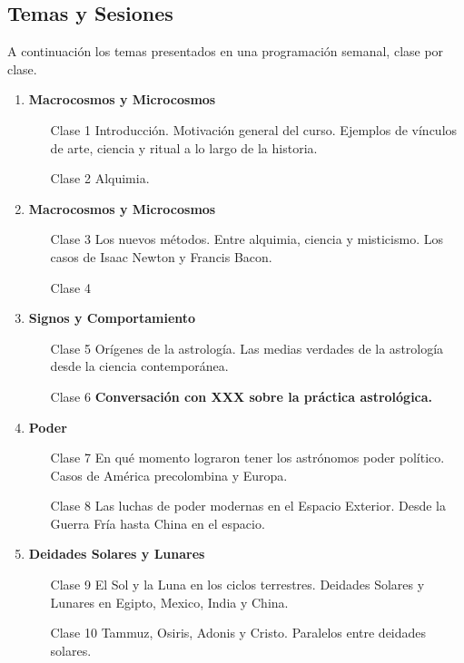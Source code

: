 \documentclass{report}
\begin{document}
\subsection*{Temas y Sesiones}

A continuaci\'on los temas presentados en una programaci\'on semanal,
clase por clase.

\begin{enumerate}
\item {\bf Macrocosmos y Microcosmos}
\begin{itemize}
\item[Clase 1] Introducci\'on. Motivaci\'on general del
  curso. Ejemplos de v\'inculos de arte, ciencia y ritual a lo
  largo de la historia.
\item[Clase 2] Alquimia.
\end{itemize}

\item {\bf Macrocosmos y Microcosmos}
\begin{itemize}
\item[Clase 3]  Los nuevos   m\'etodos. Entre alquimia, ciencia y
  misticismo.  Los casos de Isaac Newton y Francis Bacon. 
\item[Clase 4]
\end{itemize}

\item {\bf Signos y Comportamiento}
\begin{itemize}
\item[Clase 5] Or\'igenes de la astrolog\'ia. Las medias verdades de
  la astrolog\'ia desde la ciencia contempor\'anea. 
\item[Clase 6] {\bf Conversaci\'on con XXX sobre la pr\'actica
  astrol\'ogica.} 
\end{itemize}

\item {\bf Poder}
\begin{itemize}
\item[Clase 7] En qu\'e momento lograron tener los astr\'onomos poder
  pol\'itico. Casos de Am\'erica precolombina y Europa.
\item[Clase 8] Las luchas de poder modernas en el Espacio
  Exterior. Desde la Guerra Fr\'ia hasta China en el espacio.
\end{itemize}

\item {\bf Deidades Solares y Lunares}
\begin{itemize}
\item[Clase 9] El Sol y la Luna en los ciclos terrestres. Deidades
  Solares y Lunares en Egipto, Mexico, India y China.
\item[Clase 10] Tammuz, Osiris, Adonis y Cristo. Paralelos entre
  deidades solares.
\end{itemize}


\end{enumerate}
\end{document}

